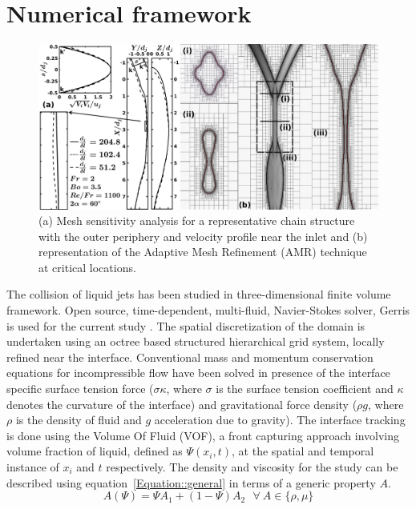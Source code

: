 \documentclass[%
 aip,
 sd,%
amsmath,amssymb,
preprint,%
author-year,%
]{revtex4-1}
\begin{document}
\section{Numerical framework}
\begin{figure}
	\centering
	\includegraphics[width=\textwidth]{Figure2}
	\caption{(a) Mesh sensitivity analysis for a representative chain structure with the outer periphery and velocity profile near the inlet and (b) representation of the Adaptive Mesh Refinement (AMR) technique at critical locations.}
	\label{Figure::gisetal}
\end{figure}
The collision of liquid jets has been studied in three-dimensional finite volume framework. Open source, time-dependent, multi-fluid, Navier-Stokes solver, Gerris is used for the current study \citep{Popinet2003}. The spatial discretization of the domain is undertaken using an octree based structured hierarchical grid system, locally refined near the interface. Conventional mass and momentum conservation equations for incompressible flow have been solved in presence of the interface specific surface tension force ($\sigma \kappa$, where $\sigma$ is the surface tension coefficient and $\kappa$ denotes the curvature of the interface) and {\color{red}gravitational force density} ($\rho g$, where $\rho$ is the density of fluid and $g$ acceleration due to gravity). The interface tracking is {\color{red}done} using the Volume Of Fluid (VOF), {\color{red}a front capturing approach involving} volume fraction of liquid, defined as $\Psi(x_i, t)$, at the spatial and temporal instance of $x_i$ and $t$ respectively. {\color{red}The} density and viscosity for the study can be described using equation~\ref{Equation::general} in terms of a generic property $A$.
\begin{equation} \label{Equation::general}
A (\Psi) = \Psi A_1 + (1-\Psi)A_2 \: \: \:  \forall  \: A \in \{\rho, \mu\}
\end{equation}
\end{document}
